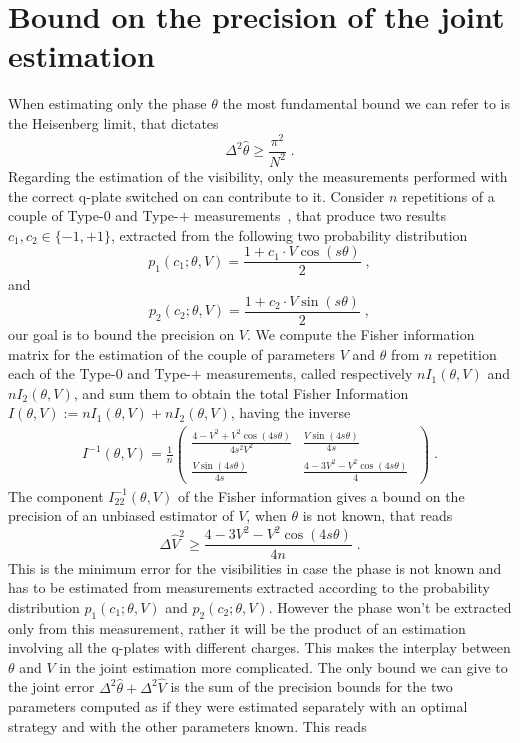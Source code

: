 \documentclass[aps, pra, 10pt, twocolumn, superscriptaddress,floatfix]{revtex4-1}
\begin{document}
\section{Bound on the precision of the joint estimation}
%
When estimating only the phase $\theta$ the most fundamental bound we can refer to is the Heisenberg limit, that dictates
%
\begin{equation}
	\Delta^2 \hat{\theta} \ge \frac{\pi^2}{N^2} \; .
	\label{eq:phaseBound}
\end{equation}
%
Regarding the estimation of the visibility, only the measurements performed with the correct q-plate switched on can contribute to it. Consider $n$ repetitions of a couple of Type-$0$ and Type-$+$ measurements~\cite{Belliardo2020}, that produce two results $c_1, c_2 \in \lbrace -1, +1 \rbrace$, extracted from the following two probability distribution
%
\begin{equation}
	p_1(c_1; \theta, V) = \frac{1 + c_1 \cdot V \cos (s \theta)}{2} \; ,
\end{equation}
%
and 
%
\begin{equation}
	p_2(c_2; \theta, V) = \frac{1 + c_2 \cdot V \sin (s \theta)}{2} \; ,
\end{equation}
%
our goal is to bound the precision on $V$. We compute the Fisher information matrix for the estimation of the couple of parameters $V$ and $\theta$ from $n$ repetition each of the Type-$0$ and Type-$+$ measurements, called respectively $n I_1 (\theta, V)$ and $n I_2(\theta, V)$, and sum them to obtain the total Fisher Information $I(\theta, V) := n I_1 (\theta, V) + n I_2 (\theta, V)$, having the inverse
%
\begin{eqnarray*}
	I^{-1} ( \theta, V) = \frac{1}{n} \begin{pmatrix}
	\frac{4 - V^2 + V^2 \cos (4 s \theta)}{4 s^2 V^2} & \frac{V \sin (4 s \theta)}{4s} \\
		\frac{V \sin (4 s \theta)}{4s} & \frac{4 - 3 V^2 - V^2 \cos (4 s \theta)}{4} \;
	\end{pmatrix}\; .
\end{eqnarray*}
%
The component $I^{-1}_{22}(\theta, V)$ of the Fisher information gives a bound on the precision of an unbiased estimator of $V$, when $\theta$ is not known, that reads
%
\begin{equation}
	\Delta \hat{V}^2 \ge \frac{4 - 3 V^2 - V^2 \cos (4 s \theta)}{4 n} \; .
\end{equation}
%
This is the minimum error for the visibilities in case the phase is not known and has to be estimated from measurements extracted according to the probability distribution $p_1(c_1; \theta, V)$ and $p_2(c_2; \theta, V)$. However the phase won't be extracted only from this measurement, rather it will be the product of an estimation involving all the q-plates with different charges. This makes the interplay between $\theta$ and $V$ in the joint estimation more complicated. The only bound we can give to the joint error $\Delta^2 \hat{\theta} + \Delta^2 \hat{V}$ is the sum of the precision bounds for the two parameters computed as if they were estimated separately with an optimal strategy and with the other parameters known. This reads
\end{document}
